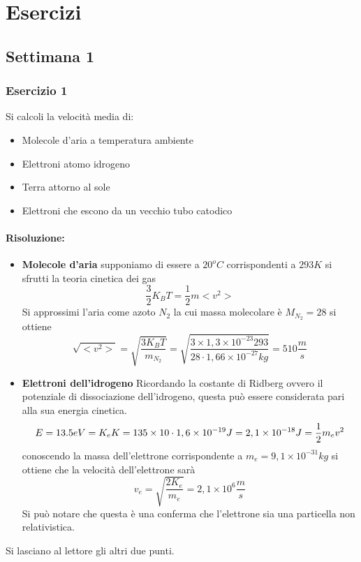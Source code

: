 \section{Esercizi}
\subsection{Settimana 1}
\subsubsection{Esercizio 1}
Si calcoli la velocità media di:
\begin{itemize}
\item Molecole d'aria a temperatura ambiente
\item Elettroni atomo idrogeno
\item Terra attorno al sole
\item Elettroni che escono da un vecchio tubo catodico
\end{itemize}

\paragraph{Risoluzione:}
\begin{itemize}
\item \textbf{Molecole d'aria}
supponiamo di essere a $20^oC$ corrispondenti a $293K$ si sfrutti la teoria cinetica dei gas
\begin{equation}
\frac{3}{2}K_BT=\frac{1}{2}m<v^2>
\end{equation}
Si approssimi l'aria come azoto $N_2$ la cui massa molecolare è $M_{N_2}=28$
si ottiene
\begin{equation}
\sqrt{<v^2>}=\sqrt{\frac{3K_BT}{m_{N_2}}}=\sqrt{\frac{3\times1,3\times10^{-23}293}{28\cdot 1,66\times10^{-27}kg}}=510\frac{m}{s}
\end{equation}
\item \textbf{Elettroni dell'idrogeno}
Ricordando la costante di Ridberg ovvero il potenziale di dissociazione dell'idrogeno, questa può essere considerata pari alla sua energia cinetica.
\begin{equation}
E=13.5eV=K_e\\
K=135\times10\cdot1,6\times10^{-19}J=2,1\times10^{-18}J=\frac{1}{2}m_ev^2
\end{equation}
conoscendo la massa dell'elettrone corrispondente a $m_e=9,1\times10^{-31}kg$ si ottiene che la velocità dell'elettrone sarà
\begin{equation}
v_e=\sqrt{\frac{2K_e}{m_e}}=2,1\times10^6\frac{m}{s}
\end{equation}
Si può notare che questa è una conferma che l'elettrone sia una particella non relativistica.
\end{itemize}
Si lasciano al lettore gli altri due punti.

